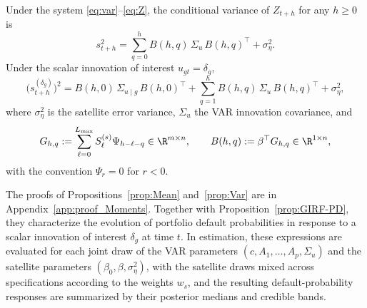 \begin{prop}
\label{prop:Var}
    Under the system \eqref{eq:var}--\eqref{eq:Z}, the conditional variance
    of $Z_{t+h}$ for any $h\ge 0$ is
    \begin{equation}
        \label{eq:s2-baseline}
        s^2_{t+h}
        =
        \sum_{q=0}^{h}
            B(h,q)\,\Sigma_u\,B(h,q)^\top
        +
        \sigma_\eta^2.
    \end{equation}
    Under the scalar innovation of interest $u_{gt}=\delta_g$,
    \begin{equation}
        \label{eq:s2-shocked}
        \big(s^{(\delta_g)}_{t+h}\big)^2
        =
        B(h,0)\,\Sigma_{u\mid g}\,B(h,0)^\top
        +
        \sum_{q=1}^{h}
            B(h,q)\,\Sigma_u\,B(h,q)^\top
        +
        \sigma_\eta^2,
    \end{equation}
    where $\sigma_\eta^2$ is the satellite error variance, $\Sigma_u$ the
    VAR innovation covariance, and
    \begin{equation}
        \label{eq:G-hq}
        G_{h,q}
        :=
        \sum_{\ell=0}^{L_{\max}}
            S^{(s)}_\ell\Psi_{h-\ell-q}
        \in \R^{m\times n},
        \qquad
        B(h,q)
        :=
        \beta^\top G_{h,q}
        \in \R^{1\times n},
    \end{equation}
    with the convention $\Psi_r=0$ for $r<0$.
\end{prop}
The proofs of Propositions~\ref{prop:Mean} and~\ref{prop:Var} are in
Appendix~\ref{app:proof_Moments}. Together with Proposition~\ref{prop:GIRF-PD},
they characterize the evolution of portfolio default probabilities in response to
a scalar innovation of interest $\delta_g$ at time $t$. In estimation, these
expressions are evaluated for each joint draw of the VAR parameters
$(c,A_1,\dots,A_p,\Sigma_u)$ and the satellite parameters
$(\beta_0,\beta,\sigma_\eta^2)$, with the satellite draws mixed across
specifications according to the weights $w_s$, and the resulting
default-probability responses are summarized by their posterior medians and
credible bands.
